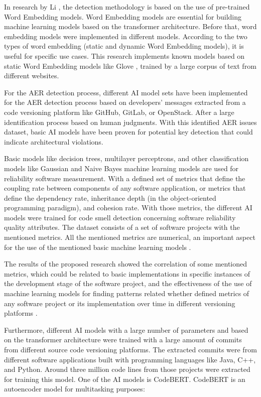 In research by Li \cite{er_word_embedding}, the detection methodology is based on the use of pre-trained Word Embedding models. Word Embedding models are essential for building machine learning models based on the transformer architecture. Before that, word embedding models were implemented in different models. According to the two types of word embedding (static and dynamic Word Embedding models), it is useful for specific use cases. This research implements known models based on static Word Embedding models like Glove \cite{glove}, trained by a large corpus of text from different websites.


For the AER detection process, different AI model sets have been implemented for the AER detection process based on developers' messages extracted from a code versioning platform like GitHub, GitLab, or OpenStack. After a large identification process based on human judgments. With this identified AER issues dataset, basic AI models have been proven for potential key detection that could indicate architectural violations. 


Basic models like decision trees, multilayer perceptrons, and other classification models like Gaussian and Naive Bayes machine learning models are used for reliability software measurement. With a defined set of metrics that define the coupling rate between components of any software application, or metrics that define the dependency rate, inheritance depth (in the object-oriented programming paradigm), and cohesion rate. With those metrics, the different AI models were trained for code smell detection concerning software reliability quality attributes. The dataset consists of a set of software projects with the mentioned metrics. All the mentioned metrics are numerical, an important aspect for the use of the mentioned basic machine learning models \cite{perceptron_model}.

The results of the proposed research showed the correlation of some mentioned metrics, which could be related to basic implementations in specific instances of the development stage of the software project, and the effectiveness of the use of machine learning models for finding patterns related whether defined metrics of any software project or its implementation over time in different versioning platforms  \cite{perceptron_model}.


Furthermore, different AI models with a large number of parameters and based on the transformer architecture were trained with a large amount of commits from different source code versioning platforms. The extracted commits were from different software applications built with programming languages like Java, C++, and Python. Around three million code lines from those projects were extracted for training this model. 
One of the AI models is CodeBERT. CodeBERT is an autoencoder model for multitasking purposes: 

